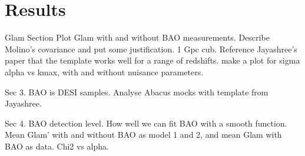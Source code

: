 \section{Results}\label{sec:results}

Glam Section
Plot Glam with and without BAO measurements.
Describe Molino's covariance and put some justification. 1 Gpc cub.
Reference Jayashree's paper that the template works well for a range of redshifts. make a plot for sigma alpha vs kmax, with and without nuisance parameters.

Sec 3. BAO is DESI samples. Analyse Abacus mocks with template from Jayashree. 

Sec 4. BAO detection level. How well we can fit BAO with a smooth function. Mean Glam' with and without BAO as model 1 and 2, and mean Glam with BAO as data. Chi2 vs alpha.
